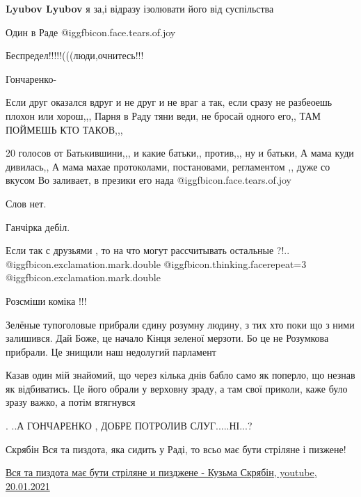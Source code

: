\begin{itemize}
\begin{itemize}
\textbf{Lyubov Lyubov} я за,і відразу ізолювати його від суспільства
\end{itemize} %

Один в Раде  @igg{fbicon.face.tears.of.joy} 

Беспредел!!!!!(((люди,очнитесь!!!

Гончаренко-


Если друг оказался вдруг и не друг и не враг а так, если сразу не разбеоешь
плохон или хорош,,, Парня в Раду тяни веди, не бросай одного его,, ТАМ ПОЙМЕШЬ
КТО ТАКОВ,,,


20 голосов от Батькившини,,, и какие батьки,, против,,, ну и батьки, А мама
куди дивилась,, А мама махае протоколами, постановами, регламентом ,, дуже со
вкусом
Во заливает, в презики его нада  @igg{fbicon.face.tears.of.joy} 

Слов нет.

Ганчірка дебіл.


Если так с друзьями , то на что могут рассчитывать остальные ?!..
@igg{fbicon.exclamation.mark.double}  @igg{fbicon.thinking.face}{repeat=3}   @igg{fbicon.exclamation.mark.double}

Розсміши коміка !!!


Зелёные тупоголовые прибрали єдину розумну людину, з тих хто поки що з ними
залишився. Дай Боже, це начало Кінця зеленої мерзоти. Бо це не Розумкова
прибрали. Це знищили наш недолугий парламент



Казав один мій знайомий, що через кілька днів бабло само як поперло, що незнав
як відбиватись. Це його обрали у верховну зраду, а там свої приколи, каже було
зразу важко, а потім втягнувся


. ..А ГОНЧАРЕНКО , ДОБРЕ ПОТРОЛИВ СЛУГ.....НІ...?

Скрябін Вся та пиздота, яка сидить у Раді, то всьо має бути стріляне і пизжене!

\href{https://www.youtube.com/watch?v=bi6r20XzsLA}{%
Вся та пиздота має бути стріляне и пизджене - Кузьма Скрябін, youtube, 20.01.2021%
}


\end{itemize}
